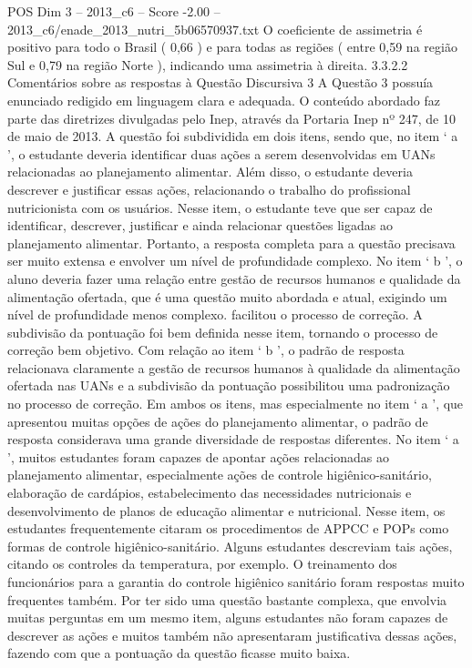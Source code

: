 \begin{textsample}{POS Dim 3 – 2013\_c6 – Score -2.00 – 2013\_c6/enade\_2013\_nutri\_5b06570937.txt}
O coeficiente de assimetria é positivo para todo o Brasil ( 0,66 ) e para todas as regiões ( entre 0,59 na região Sul e 0,79 na região Norte ), indicando uma assimetria à direita. 3.3.2.2 Comentários sobre as respostas à Questão Discursiva 3 A Questão 3 possuía enunciado redigido em linguagem clara e adequada.
O conteúdo abordado faz parte das diretrizes divulgadas pelo Inep, através da Portaria Inep nº 247, de 10 de maio de 2013.
A questão foi subdividida em dois itens, sendo que, no item ‘ a ’, o estudante deveria identificar duas ações a serem desenvolvidas em UANs relacionadas ao planejamento alimentar.
Além disso, o estudante deveria descrever e justificar essas ações, relacionando o trabalho do profissional nutricionista com os usuários.
Nesse item, o estudante teve que ser capaz de identificar, descrever, justificar e ainda relacionar questões ligadas ao planejamento alimentar.
Portanto, a resposta completa para a questão precisava ser muito extensa e envolver um nível de profundidade complexo.
No item ‘ b ’, o aluno deveria fazer uma relação entre gestão de recursos humanos e qualidade da alimentação ofertada, que é uma questão muito abordada e atual, exigindo um nível de profundidade menos complexo. facilitou o processo de correção.
A subdivisão da pontuação foi bem definida nesse item, tornando o processo de correção bem objetivo.
Com relação ao item ‘ b ’, o padrão de resposta relacionava claramente a gestão de recursos humanos à qualidade da alimentação ofertada nas UANs e a subdivisão da pontuação possibilitou uma padronização no processo de correção.
Em ambos os itens, mas especialmente no item ‘ a ’, que apresentou muitas opções de ações do planejamento alimentar, o padrão de resposta considerava uma grande diversidade de respostas diferentes.
No item ‘ a ’, muitos estudantes foram capazes de apontar ações relacionadas ao planejamento alimentar, especialmente ações de controle higiênico-sanitário, elaboração de cardápios, estabelecimento das necessidades nutricionais e desenvolvimento de planos de educação alimentar e nutricional.
Nesse item, os estudantes frequentemente citaram os procedimentos de APPCC e POPs como formas de controle higiênico-sanitário.
Alguns estudantes descreviam tais ações, citando os controles da temperatura, por exemplo.
O treinamento dos funcionários para a garantia do controle higiênico sanitário foram respostas muito frequentes também.
Por ter sido uma questão bastante complexa, que envolvia muitas perguntas em um mesmo item, alguns estudantes não foram capazes de descrever as ações e muitos também não apresentaram justificativa dessas ações, fazendo com que a pontuação da questão ficasse muito baixa.

\end{textsample}
